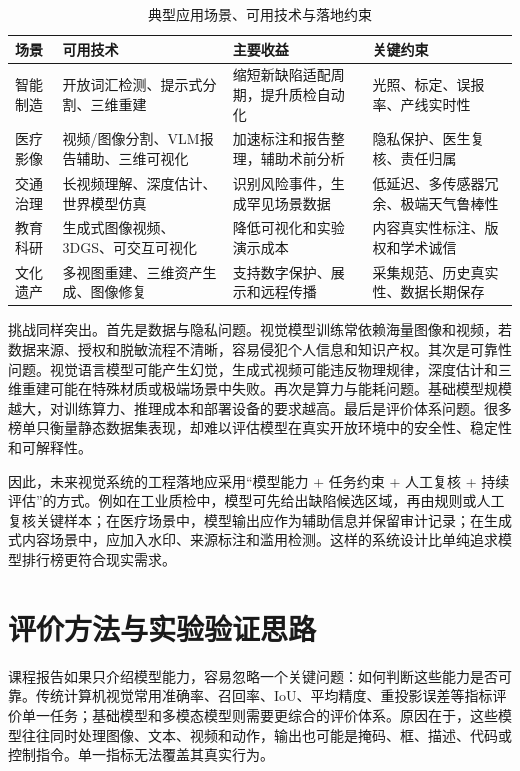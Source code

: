 \documentclass[UTF8,a4paper,12pt]{ctexart}
\begin{document}
\begin{table}[htbp]
\centering
\small
\caption{典型应用场景、可用技术与落地约束}
\begin{tabularx}{\textwidth}{C{2.3cm}Y Y Y}
\toprule
\textbf{场景} & \textbf{可用技术} & \textbf{主要收益} & \textbf{关键约束} \\
\midrule
智能制造 & 开放词汇检测、提示式分割、三维重建 & 缩短新缺陷适配周期，提升质检自动化 & 光照、标定、误报率、产线实时性 \\
医疗影像 & 视频/图像分割、VLM报告辅助、三维可视化 & 加速标注和报告整理，辅助术前分析 & 隐私保护、医生复核、责任归属 \\
交通治理 & 长视频理解、深度估计、世界模型仿真 & 识别风险事件，生成罕见场景数据 & 低延迟、多传感器冗余、极端天气鲁棒性 \\
教育科研 & 生成式图像视频、3DGS、可交互可视化 & 降低可视化和实验演示成本 & 内容真实性标注、版权和学术诚信 \\
文化遗产 & 多视图重建、三维资产生成、图像修复 & 支持数字保护、展示和远程传播 & 采集规范、历史真实性、数据长期保存 \\
\bottomrule
\end{tabularx}
\end{table}

挑战同样突出。首先是数据与隐私问题。视觉模型训练常依赖海量图像和视频，若数据来源、授权和脱敏流程不清晰，容易侵犯个人信息和知识产权。其次是可靠性问题。视觉语言模型可能产生幻觉，生成式视频可能违反物理规律，深度估计和三维重建可能在特殊材质或极端场景中失败。再次是算力与能耗问题。基础模型规模越大，对训练算力、推理成本和部署设备的要求越高。最后是评价体系问题。很多榜单只衡量静态数据集表现，却难以评估模型在真实开放环境中的安全性、稳定性和可解释性。

因此，未来视觉系统的工程落地应采用“模型能力 + 任务约束 + 人工复核 + 持续评估”的方式。例如在工业质检中，模型可先给出缺陷候选区域，再由规则或人工复核关键样本；在医疗场景中，模型输出应作为辅助信息并保留审计记录；在生成式内容场景中，应加入水印、来源标注和滥用检测。这样的系统设计比单纯追求模型排行榜更符合现实需求。

\section{评价方法与实验验证思路}
课程报告如果只介绍模型能力，容易忽略一个关键问题：如何判断这些能力是否可靠。传统计算机视觉常用准确率、召回率、IoU、平均精度、重投影误差等指标评价单一任务；基础模型和多模态模型则需要更综合的评价体系。原因在于，这些模型往往同时处理图像、文本、视频和动作，输出也可能是掩码、框、描述、代码或控制指令。单一指标无法覆盖其真实行为。
\end{document}
